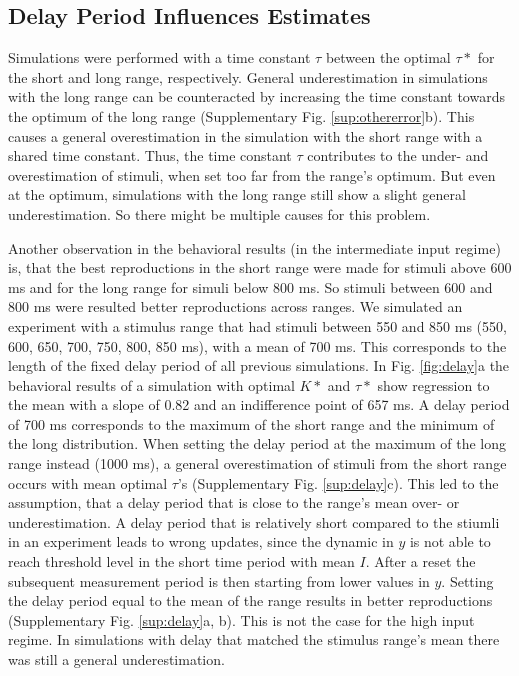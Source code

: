 \documentclass[10pt]{article}
\begin{document}
\subsection{Delay Period Influences Estimates}
Simulations were performed with a time constant $\tau$ between the optimal $\tau*$ for the short and long range, respectively.
General underestimation in simulations with the long range can be counteracted by increasing the time constant towards the optimum of the long range (Supplementary Fig. \ref{sup:othererror}b). This causes a general overestimation in the simulation with the short range with a shared time constant. 
Thus, the time constant $\tau$ contributes to the under- and overestimation of stimuli, when set too far from the range's optimum. But even at the optimum, simulations with the long range still show a slight general underestimation.
So there might be multiple causes for this problem.

Another observation in the behavioral results (in the intermediate input regime) is, that the best reproductions in the short range were made for stimuli above 600 ms and for the long range for simuli below 800 ms. So stimuli between 600 and 800 ms were resulted better reproductions  across ranges. 
We simulated an experiment with a stimulus range that had stimuli between 550 and 850 ms (550, 600, 650, 700, 750, 800, 850 ms), with a mean of 700 ms. This corresponds to the length of the fixed delay period of all previous simulations. In Fig. \ref{fig:delay}a the behavioral results of a simulation with optimal $K*$ and $\tau*$ show regression to the mean with a slope of 0.82 and an indifference point of 657 ms.
A delay period of 700 ms corresponds to the maximum of the short range and the minimum of the long distribution. 
When setting the delay period at the maximum of the long range instead (1000 ms), a general overestimation of stimuli from the short range occurs with mean optimal $\tau$'s (Supplementary Fig. \ref{sup:delay}c).
This led to the assumption, that a delay period that is close to the range's mean over- or underestimation. 
A delay period that is relatively short compared to the stiumli in an experiment leads to wrong updates, since the dynamic in $y$ is not able to reach threshold level in the short time period with mean $I$. 
After a reset the subsequent measurement period is then starting from lower values in $y$. 
Setting the delay period equal to the mean of the range results in better reproductions 
(Supplementary Fig. \ref{sup:delay}a, b).
This is not the case for the high input regime. In simulations with delay that matched the stimulus range's mean there was still a general underestimation. 
\end{document}
